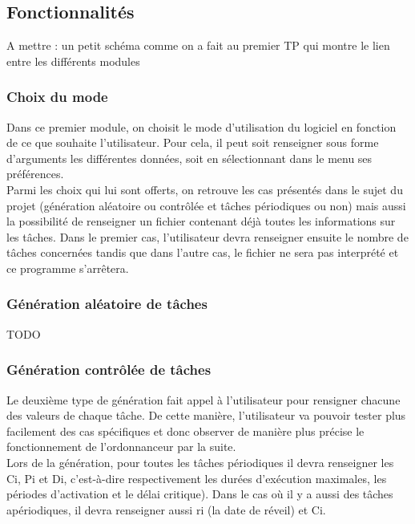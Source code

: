 		\subsection{Fonctionnalités}

			\Huge
			A mettre : un petit schéma comme on a fait au premier TP qui montre le lien entre les différents modules
			\normalsize
		    
			\subsubsection{Choix du mode}
				Dans ce premier module, on choisit le mode d’utilisation du logiciel en fonction de ce que souhaite l’utilisateur. Pour cela, il peut soit renseigner sous forme d’arguments les différentes données, soit en sélectionnant dans le menu ses préférences. \\

				Parmi les choix qui lui sont offerts, on retrouve les cas présentés dans le sujet du projet (génération aléatoire ou contrôlée et tâches périodiques ou non) mais aussi la possibilité de renseigner un fichier contenant déjà toutes les informations sur les tâches. Dans le premier cas, l’utilisateur devra renseigner ensuite le nombre de tâches concernées tandis que dans l’autre cas, le fichier ne sera pas interprété et ce programme s’arrêtera.


			\subsubsection{Génération aléatoire de tâches}
				\Huge
				TODO
				\normalsize

			\subsubsection{Génération contrôlée de tâches}
				Le deuxième type de génération fait appel à l'utilisateur pour rensigner chacune des valeurs de chaque tâche. De cette manière, l'utilisateur va pouvoir tester plus facilement des cas spécifiques et donc observer de manière plus précise le fonctionnement de l'ordonnanceur par la suite. \\
				Lors de la génération, pour toutes les tâches périodiques il devra renseigner les Ci, Pi et Di, c'est-à-dire respectivement les durées d'exécution maximales, les périodes d'activation et le délai critique). Dans le cas où il y a aussi des tâches apériodiques, il devra renseigner aussi ri (la date de réveil) et Ci.

